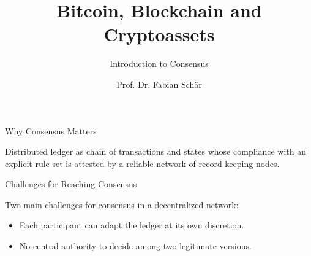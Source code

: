 \documentclass[]{beamer}
\title{Bitcoin, Blockchain and Cryptoassets}
\subtitle{Introduction to Consensus}
\author{Prof. Dr. Fabian Schär}
\institute{University of Basel}
\begin{document}
\thispagestyle{empty}
\begin{frame}[noframenumbering]
	\titlepage
\end{frame}

\begin{frame}{Why Consensus Matters}

Distributed ledger as \color{focus} chain of transactions and states \color{black} whose \color{focus} compliance with an explicit rule set \color{black} is  attested by a reliable network of record keeping nodes.


\end{frame}

\begin{frame}{Challenges for Reaching Consensus}

Two main challenges for consensus in a decentralized network:
	
	\begin{itemize}
		\item<1-> Each participant can adapt the ledger at its own discretion.
		\item<2-> No central authority to decide among two legitimate versions.
	\end{itemize}

\vspace{1 em}
\begin{center}
\begin{tikzpicture}[scale=0.8, every node/.style ={scale=0.8}]
		
\end{tikzpicture}
\end{center}

\end{frame}
\end{document}
